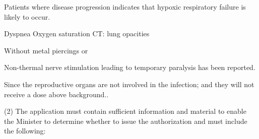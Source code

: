 \documentclass[fleqn,10pt]{paper}
\begin{document}
Patients where disease progression indicates that hypoxic respiratory failure is likely to occur.

Dyspnea
Oxygen saturation
CT: lung opacities

Without metal piercings or 




Non-thermal nerve stimulation leading to temporary paralysis has been reported. 

Since the reproductive organs are not involved in the infection; and they will not receive a dose above background.\cite{Organ2004}.





\citationneeded



(2) The application must contain sufficient information and material to enable the Minister to determine whether to issue the authorization and must include the following:
\end{document}
